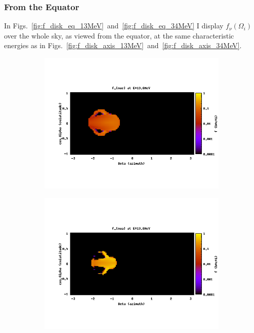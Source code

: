 \subsubsection{From the Equator}
\label{sssc:f_this_case_E}

In Figs.~\ref{fig:f_disk_eq_13MeV}~and~\ref{fig:f_disk_eq_34MeV} I display
$f_\nu(\Omega_i)$ over the whole sky, as viewed from the equator, at the
same characteristic energies as in
Figs.~\ref{fig:f_disk_axis_13MeV}~and~\ref{fig:f_disk_axis_34MeV}.

\begin{figure}
  \centering
  \begin{subfigure}{.3\textwidth}
    \centering
    \includegraphics[width=1\linewidth]{Figures/f_nue-E-13MeV}
  \end{subfigure}
  \begin{subfigure}{.3\textwidth}
    \centering
    \includegraphics[width=1\linewidth]{Figures/f_nua-E-13MeV}

\end{subfigure}
\end{figure}

